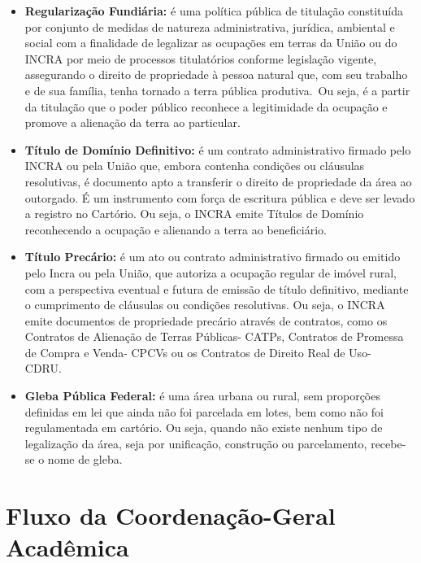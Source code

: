 \documentclass[
  letterpaper,
]{report}
\begin{document}
\begin{itemize}
\item
  \textbf{Regularização Fundiária:} é uma política pública de titulação
  constituída por conjunto de medidas de natureza administrativa,
  jurídica, ambiental e social com a finalidade de legalizar as
  ocupações em terras da União ou do INCRA por meio de processos
  titulatórios conforme legislação vigente, assegurando o direito de
  propriedade à pessoa natural que, com seu trabalho e de sua família,
  tenha tornado a terra pública produtiva.~Ou seja, é a partir da
  titulação que o poder público reconhece a legitimidade da ocupação e
  promove a alienação da terra ao particular.~
\item
  \textbf{Título de Domínio Definitivo:} é um contrato administrativo
  firmado pelo INCRA ou pela União que, embora contenha condições ou
  cláusulas resolutivas, é documento apto a transferir o direito de
  propriedade da área ao outorgado. É um instrumento com força de
  escritura pública e deve ser levado a registro no Cartório. Ou seja, o
  INCRA emite Títulos de Domínio reconhecendo a ocupação e alienando a
  terra ao beneficiário.~
\item
  \textbf{Título Precário:} é um ato ou contrato administrativo firmado
  ou emitido pelo Incra ou pela União, que autoriza a ocupação regular
  de imóvel rural, com a perspectiva eventual e futura de emissão de
  título definitivo, mediante o cumprimento de cláusulas ou condições
  resolutivas. Ou seja, o INCRA emite documentos de propriedade precário
  através de contratos, como os Contratos de Alienação de Terras
  Públicas- CATPs, Contratos de Promessa de Compra e Venda- CPCVs ou os
  Contratos de Direito Real de Uso- CDRU.~
\item
  \textbf{Gleba Pública Federal:} é uma área urbana ou rural, sem
  proporções definidas em lei que ainda não foi parcelada em lotes, bem
  como não foi regulamentada em cartório. Ou seja, quando não existe
  nenhum tipo de legalização da área, seja por unificação, construção ou
  parcelamento, recebe- se o nome de gleba.~
\end{itemize}

\hypertarget{fluxo-da-coordenauxe7uxe3o-geral-acaduxeamica}{%
\section{Fluxo da Coordenação-Geral
Acadêmica}\label{fluxo-da-coordenauxe7uxe3o-geral-acaduxeamica}}
\end{document}
